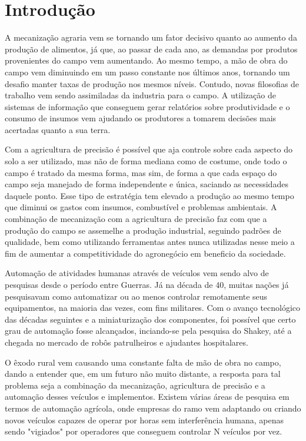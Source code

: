 \chapter{Introdução}
\label{cap:introducao}

A mecanização agraria vem se tornando um fator decisivo quanto ao aumento da produção de alimentos, já que, ao passar de cada ano, as demandas por produtos provenientes do campo vem aumentando. Ao mesmo tempo, a mão de obra do campo vem diminuindo em um passo constante nos últimos anos, tornando um desafio manter taxas de produção nos mesmos níveis. Contudo, novas filosofias de trabalho vem sendo assimiladas da industria para o campo. A utilização de sistemas de informação que conseguem gerar relatórios sobre produtividade e o consumo de insumos vem ajudando os produtores a tomarem decisões mais acertadas quanto a sua terra. 

Com a agricultura de precisão é possível que aja controle sobre cada aspecto do solo a ser utilizado, mas não de forma mediana como de costume, onde todo o campo é tratado da mesma forma, mas sim, de forma a que cada espaço do campo seja manejado de forma independente e única, saciando as necessidades daquele ponto. Esse tipo de estratégia tem elevado a produção ao mesmo tempo que diminui os gastos com insumos, combustível e problemas ambientais. A combinação de mecanização com a agricultura de precisão faz com que a produção do campo se assemelhe a produção industrial, seguindo padrões de qualidade, bem como utilizando ferramentas antes nunca utilizadas nesse meio a fim de aumentar a competitividade do agronegócio em beneficio da sociedade\cite{Viana2009}.

Automação de atividades humanas através de veículos vem sendo alvo de pesquisas desde o período entre Guerras. Já na década de 40, muitas nações já pesquisavam como automatizar ou ao menos controlar remotamente seus equipamentos, na maioria das vezes, com fins militares. Com o avanço tecnológico das décadas seguintes e a miniaturização dos componentes, foi possível que certo grau de automação fosse alcançados, inciando-se pela pesquisa do Shakey\cite{cassel:2017}, até a chegada no mercado de robôs patrulheiros e ajudantes hospitalares.

O êxodo rural vem causando uma constante falta de mão de obra no campo, dando a entender que, em um futuro não muito distante, a resposta para tal problema seja a combinação da mecanização, agricultura de precisão e a automação desses veículos e implementos. Existem várias áreas de pesquisa em termos de automação agrícola, onde empresas do ramo vem adaptando ou criando novos veículos capazes de operar por horas sem interferência humana, apenas sendo "vigiados" por operadores que conseguem controlar N veículos por vez.

